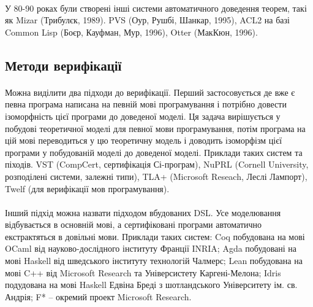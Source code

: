 \documentclass[11pt,oneside]{article}
\begin{document}
    \paragraph{}
    У 80-90 роках були створені інші системи автоматичного доведення теорем,
    такі як Mizar (Трибулєк, 1989). PVS (Оур, Рушбі, Шанкар, 1995),
    ACL2 на базі Common Lisp (Боєр, Кауфман, Мур, 1996), Otter (МакКюн, 1996).

    \paragraph{}

\newpage
\subsection{Методи верифікації}

    \paragraph{}
    Можна виділити два підходи до верифікації. Перший застосовується де вже є
    певна програма написана на певній мові програмування і потрібно довести ізоморфність
    цієї програми до доведеної моделі. Ця задача вирішується у побудові теоретичної моделі
    для певної мови програмування, потім програма на цій мові переводиться у цю
    теоретичну модель і доводить ізоморфізм цієї програми у побудованій моделі до доведеної моделі.
    Приклади таких систем та піходів. VST (CompCert, сертифікація Сі-програм),
    NuPRL (Cornell University, розподілені системи, залежні типи),
    TLA+ (Microsoft Reseach, Леслі Лампорт), Twelf (для верифікації мов програмування).

    \paragraph{}
    Інший підхід можна назвати підходом вбудованих DSL. Усе моделювання відбувається
    в основній мові, а сертифіковані програми автоматично екстрактяться в довільні мови.
    Приклади таких систем: Coq побудована на мові OCaml від науково-дослідного
    інституту Франції INRIA; Agda побудовані на мові Haskell від шведського інституту технологій Чалмерс;
    Lean побудована на мові C++ від Microsoft Research та Універсистету Каргені-Мелона;
    Idris подудована на мові Haskell Едвіна Бреді з шотландського Університету ім. св. Андрія;
    F* -- окремий проект Microsoft Research.

\newpage
\end{document}
